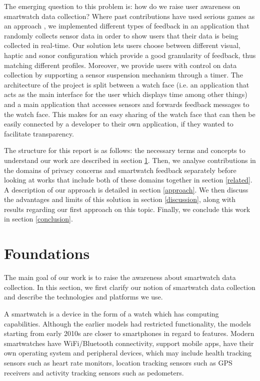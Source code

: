 \documentclass[conference, a4paper, 10pt, twocolumn]{IEEEtran}
\begin{document}
The emerging question to this problem is: how do we raise user awareness on smartwatch data collection? Where past contributions have used serious games as an approach \cite{williams2019smart}, we implemented different types of feedback in an application that randomly collects sensor data in order to show users that their data is being collected in real-time. Our solution lets users choose between different visual, haptic and sonor configuration which provide a good granularity of feedback, thus matching different profiles. Moreover, we provide users with control on data collection by supporting a sensor suspension mechanism through a timer. The architecture of the project is split between a watch face (i.e. an application that acts as the main interface for the user which displays time among other things) and a main application that accesses sensors and forwards feedback messages to the watch face. This makes for an easy sharing of the watch face that can then be easily connected by a developer to their own application, if they wanted to facilitate transparency.

The structure for this report is as follows: the necessary terms and concepts to understand our work are described in section \ref{foundations}. Then, we analyse contributions in the domains of privacy concerns and smartwatch feedback separately before looking at works that include both of these domains together in section \ref{related}. A description of our approach is detailed in section \ref{approach}. We then discuss the advantages and limits of this solution in section \ref{discussion}, along with results regarding our first approach on this topic. Finally, we conclude this work in section \ref{conclusion}.   

\section{Foundations}\label{foundations}

The main goal of our work is to raise the awareness about smartwatch data collection. In this section, we first clarify our notion of smartwatch data collection and describe the technologies and platforms we use. 

A smartwatch is a device in the form of a watch which has computing capabilities. Although the earlier models had restricted functionality, the models starting from early 2010s are closer to smartphones in regard to features. Modern smartwatches have WiFi/Bluetooth connectivity, support mobile apps, have their own operating system and peripheral devices, which may include health tracking sensors such as heart rate monitors, location tracking sensors such as GPS receivers and activity tracking sensors such as pedometers.\cite{smartwatch}
\end{document}
